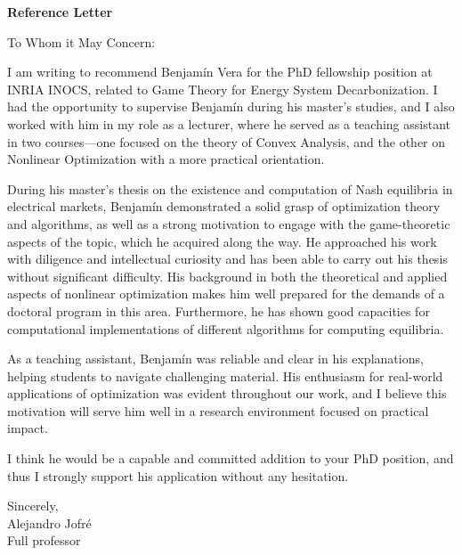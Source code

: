 \documentclass{letter}
\date{}
\begin{document}
\begin{letter}
	{
		\centering \Large \textbf{Reference Letter}
	}

	\opening{To Whom it May Concern:}
	\medskip

	I am writing to recommend Benjamín Vera for the PhD fellowship position at INRIA INOCS, related to Game Theory for Energy System Decarbonization. I had the opportunity to supervise Benjamín during his master’s studies, and I also worked with him in my role as a lecturer, where he served as a teaching assistant in two courses—one focused on the theory of Convex Analysis, and the other on Nonlinear Optimization with a more practical orientation.

	During his master's thesis on the existence and computation of Nash equilibria in electrical markets, Benjamín demonstrated a solid grasp of optimization theory and algorithms, as well as a strong motivation to engage with the game-theoretic aspects of the topic, which he acquired along the way. He approached his work with diligence and intellectual curiosity and has been able to carry out his thesis without significant difficulty. His background in both the theoretical and applied aspects of nonlinear optimization makes him well prepared for the demands of a doctoral program in this area. Furthermore, he has shown good capacities for computational implementations of different algorithms for computing equilibria.

	As a teaching assistant, Benjamín was reliable and clear in his explanations, helping students to navigate challenging material. His enthusiasm for real-world applications of optimization was evident throughout our work, and I believe this motivation will serve him well in a research environment focused on practical impact.

	I think he would be a capable and committed addition to your PhD position, and thus I strongly support his application without any hesitation.

	\medskip
	Sincerely, \\
	Alejandro Jofré \\
	Full professor

\end{letter}
\end{document}
